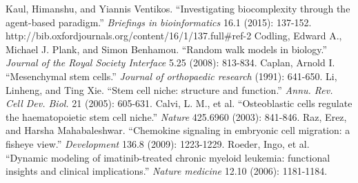 \documentclass[12pt]{article}
\begin{document}
\begin{thebibliography}{9}
  Kaul, Himanshu, and Yiannis Ventikos. ``Investigating biocomplexity through the agent-based paradigm.'' {\itshape Briefings in bioinformatics} 16.1 (2015): 137-152. http://bib.oxfordjournals.org/content/16/1/137.full\#ref-2
  Codling, Edward A., Michael J. Plank, and Simon Benhamou. ``Random walk models in biology.'' {\itshape Journal of the Royal Society Interface} 5.25 (2008): 813-834.
  Caplan, Arnold I. ``Mesenchymal stem cells.'' {\itshape Journal of orthopaedic research} (1991): 641-650.
  Li, Linheng, and Ting Xie. ``Stem cell niche: structure and function.'' {\itshape Annu. Rev. Cell Dev. Biol.} 21 (2005): 605-631.
  Calvi, L. M., et al. ``Osteoblastic cells regulate the haematopoietic stem cell niche.'' {\itshape Nature} 425.6960 (2003): 841-846.
  Raz, Erez, and Harsha Mahabaleshwar. ``Chemokine signaling in embryonic cell migration: a fisheye view.'' {\itshape Development} 136.8 (2009): 1223-1229.
  Roeder, Ingo, et al. ``Dynamic modeling of imatinib-treated chronic myeloid leukemia: functional insights and clinical implications.'' {\itshape Nature medicine} 12.10 (2006): 1181-1184.
\end{thebibliography}

\end{document}
